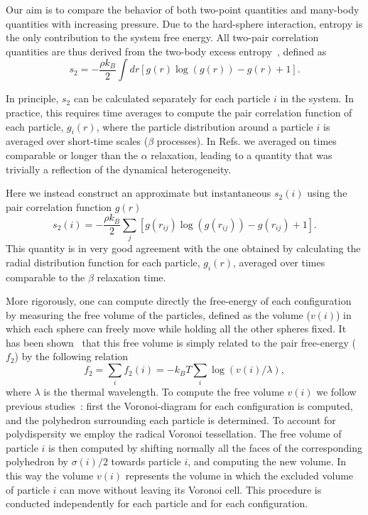 \documentclass[twocolumn,superscriptaddress]{revtex4}
\begin{document}
Our aim is to compare the behavior of both two-point quantities and many-body quantities with increasing pressure.
Due to the hard-sphere interaction, entropy is the only contribution to the system free energy.
All two-pair correlation quantities are thus derived from the two-body excess entropy~\cite{Nettleton1958,Mountain1971},
defined as
\begin{equation}
s_2=-\frac{\rho k_B}{2}\int dr\left[g(r)\log(g(r))-g(r)+1\right]. 
\end{equation}

In principle, $s_2$ can be calculated separately for each particle $i$ in the system. In practice, this requires time averages to compute the pair correlation function of each particle, $g_i(r)$, where the particle distribution around a particle $i$ is averaged over short-time scales ($\beta$ processes). In Refs. \cite{tanaka,watanabe_walls,KawasakiJPCM} we averaged on times comparable or longer than the $\alpha$ relaxation, leading to a quantity that was trivially a reflection of the dynamical heterogeneity. 

Here we instead construct an approximate but instantaneous $s_2(i)$ using the pair correlation function $g(r)$
\begin{equation}
s_2(i) = -\frac{\rho k_B}{2}\sum_j \left[g(r_{ij})\log(g(r_{ij}))-g(r_{ij})+1\right].
\end{equation}
This quantity is in very good agreement with the one obtained by calculating the radial distribution function for each
particle, $g_i(r)$, averaged over times comparable to the $\beta$ relaxation time.

More rigorously, one can compute directly the free-energy of each configuration by
measuring the free volume of the particles, defined as the volume ($v(i)$) in which each sphere can freely
move while holding all the other spheres fixed. It has been shown~\cite{Aste2004} that this free
volume is simply related to the pair free-energy ($f_2$) by the following relation
\begin{equation}
f_2=\sum_i f_2(i)=-k_BT\sum_i \log(v(i)/\lambda),
\end{equation}
where $\lambda$ is the thermal wavelength. To compute the free volume $v(i)$ we follow previous
studies~\cite{Aste2004}: first the Voronoi-diagram for each configuration is computed, and the polyhedron
surrounding each particle is determined. To account for polydispersity we employ the radical Voronoi tessellation.
The free volume of particle $i$ is then
computed by shifting normally all the faces of the corresponding polyhedron by $\sigma(i)/2$
towards particle $i$, and computing the new volume. In this way
the volume $v(i)$ represents the volume in which the excluded volume of particle $i$ can move without leaving its Voronoi cell.
This procedure is conducted independently
for each particle and for each configuration.
\end{document}
